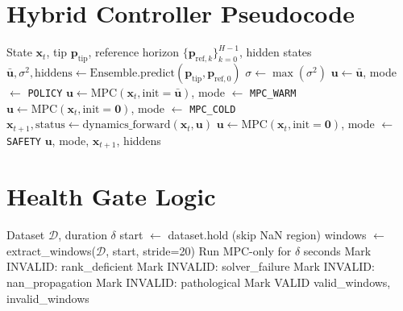 \documentclass[conference]{IEEEtran}
\begin{document}
\appendix

\section{Hybrid Controller Pseudocode}

\begin{algorithm}
\caption{Hybrid Controller Step}
\begin{algorithmic}[1]
\REQUIRE State $\mathbf{x}_t$, tip $\mathbf{p}_{\text{tip}}$, reference horizon $\{\mathbf{p}_{\text{ref},k}\}_{k=0}^{H-1}$, hidden states
\STATE $\bar{\mathbf{u}}, \sigma^2, \text{hiddens} \gets \text{Ensemble.predict}(\mathbf{p}_{\text{tip}}, \mathbf{p}_{\text{ref},0})$
\STATE $\sigma \gets \max(\sigma^2)$
    \STATE $\mathbf{u} \gets \bar{\mathbf{u}}$, mode $\gets$ \texttt{POLICY}
    \STATE $\mathbf{u} \gets \text{MPC}(\mathbf{x}_t, \text{init}=\bar{\mathbf{u}})$, mode $\gets$ \texttt{MPC\_WARM}
\ELSE
    \STATE $\mathbf{u} \gets \text{MPC}(\mathbf{x}_t, \text{init}=\mathbf{0})$, mode $\gets$ \texttt{MPC\_COLD}
\ENDIF
\STATE $\mathbf{x}_{t+1}, \text{status} \gets \text{dynamics\_forward}(\mathbf{x}_t, \mathbf{u})$
    \STATE $\mathbf{u} \gets \text{MPC}(\mathbf{x}_t, \text{init}=\mathbf{0})$, mode $\gets$ \texttt{SAFETY}
\ENDIF
\RETURN $\mathbf{u}$, mode, $\mathbf{x}_{t+1}$, hiddens
\end{algorithmic}
\end{algorithm}

\section{Health Gate Logic}

\begin{algorithm}
\caption{Window Health Gate}
\begin{algorithmic}[1]
\REQUIRE Dataset $\mathcal{D}$, duration $\delta$
\STATE start $\gets$ dataset.hold (skip NaN region)
\STATE windows $\gets$ extract\_windows($\mathcal{D}$, start, stride=20)
    \STATE Run MPC-only for $\delta$ seconds
        \STATE Mark INVALID: rank\_deficient
        \STATE Mark INVALID: solver\_failure
        \STATE Mark INVALID: nan\_propagation
        \STATE Mark INVALID: pathological
    \ELSE
        \STATE Mark VALID
    \ENDIF
\ENDFOR
\RETURN valid\_windows, invalid\_windows
\end{algorithmic}
\end{algorithm}
\end{document}
